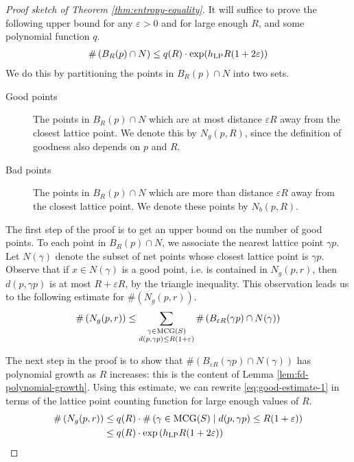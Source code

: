 \documentclass[12pt, reqno]{amsart}
\begin{document}
\begin{proof}[Proof sketch of Theorem \ref{thm:entropy-equality}]
  It will suffice to prove the following upper bound for any $\varepsilon > 0$ and for large enough $R$, and some polynomial function $q$.
  \begin{align*}
    \#\left( B_R(p) \cap N \right) \leq q(R) \cdot \exp(h_{\mathrm{LP}} R (1 + 2\varepsilon))
  \end{align*}
  We do this by partitioning the points in $B_R(p) \cap N$ into two sets.
  \begin{description}
  \item[Good points] The points in $B_R(p) \cap N$ which are at most distance $\varepsilon R$ away from the closest lattice point.
    We denote this by $N_g(p, R)$, since the definition of goodness also depends on $p$ and $R$.
  \item[Bad points] The points in $B_R(p) \cap N$ which are more than distance $\varepsilon R$ away from the closest lattice point.
    We denote these points by $N_b(p, R)$.
  \end{description}

  The first step of the proof is to get an upper bound on the number of good points.
  To each point in $B_R(p) \cap N$, we associate the nearest lattice point $\gamma p$.
  Let $N(\gamma)$ denote the subset of net points whose closest lattice point is $\gamma p$.
  Observe that if $x \in N(\gamma)$ is a good point, i.e. is contained in $N_g(p, r)$, then $d(p, \gamma p)$ is at most $R + \varepsilon R$, by the triangle inequality.
  This observation leads us to the following estimate for $\#\left( N_g(p, r) \right) $.
  \begin{align}
    \#\left( N_g(p, r) \right) \leq \sum_{\substack{\gamma \in \mathrm{MCG}(S) \\ d(p, \gamma p) \leq R(1 + \varepsilon)}} \#\left( B_{\varepsilon R}(\gamma p) \cap N(\gamma)  \right) \label{eq:good-estimate-1}
  \end{align}

  The next step in the proof is to show that $\#\left(  B_{\varepsilon R}(\gamma p) \cap N(\gamma)  \right)$ has polynomial growth as $R$ increases: this is the content of Lemma \ref{lem:fd-polynomial-growth}.
  Using this estimate, we can rewrite \eqref{eq:good-estimate-1} in terms of the lattice point counting function for large enough values of $R$.
  \begin{align}
    \label{eq:good-estimate-2}
    \#\left( N_g(p, r) \right) &\leq q(R) \cdot \#\left( \gamma \in \mathrm{MCG}(S) \mid d(p , \gamma p) \leq R(1 + \varepsilon) \right) \\
    &\leq q(R) \cdot \exp\left( h_{\mathrm{LP}} R(1 + 2\varepsilon) \right)
    \label{eq:good-estimate-3}
  \end{align}


\end{proof}
\end{document}
